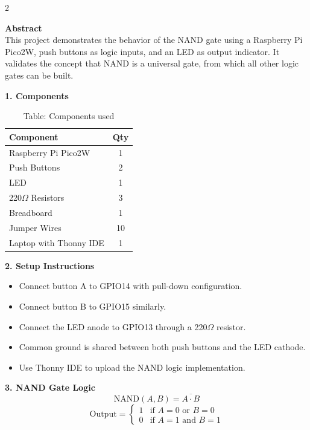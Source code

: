 \documentclass[12pt]{article}
\begin{document}
\begin{multicols}{2}

\noindent\textbf{Abstract} \\[0.5em]
This project demonstrates the behavior of the NAND gate using a Raspberry Pi Pico2W, push buttons as logic inputs, and an LED as output indicator. It validates the concept that NAND is a universal gate, from which all other logic gates can be built.

\vspace{1em}
\noindent\textbf{1. Components}
\begin{table}[H]
\small
\centering
\begin{tabular}{|p{4.2cm}|c|}
\hline
\textbf{Component} & \textbf{Qty} \\
\hline
Raspberry Pi Pico2W & 1 \\
Push Buttons & 2 \\
LED & 1 \\
220$\Omega$ Resistors & 3 \\
Breadboard & 1 \\
Jumper Wires & 10 \\
Laptop with Thonny IDE & 1 \\
\hline
\end{tabular}
\caption*{Table: Components used}
\end{table}

\vspace{1em}
\noindent\textbf{2. Setup Instructions}
\begin{itemize}
    \item Connect button A to GPIO14 with pull-down configuration.
    \item Connect button B to GPIO15 similarly.
    \item Connect the LED anode to GPIO13 through a 220$\Omega$ resistor.
    \item Common ground is shared between both push buttons and the LED cathode.
    \item Use Thonny IDE to upload the NAND logic implementation.
\end{itemize}

\vspace{1em}
\noindent\textbf{3. NAND Gate Logic}
\[
\text{NAND}(A, B) = \overline{A \cdot B}
\]
\[
\text{Output} = 
\begin{cases}
1 & \text{if } A = 0 \text{ or } B = 0 \\
0 & \text{if } A = 1 \text{ and } B = 1
\end{cases}
\]

\end{multicols}
\end{document}
